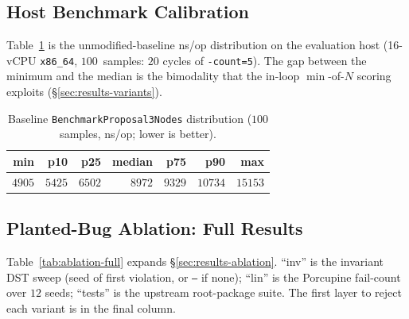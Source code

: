 \documentclass{article}
\begin{document}
\subsection{Host Benchmark Calibration}
\label{app:calibration}
Table~\ref{tab:calibration} is the unmodified-baseline ns/op
distribution on the evaluation host (16-vCPU \texttt{x86\_64},
$100$~samples: $20$ cycles of \texttt{-count=5}). The gap between the
minimum and the median is the bimodality that the in-loop
$\min$-of-$N$ scoring exploits (\S\ref{sec:results-variants}).

\begin{table}[h]
  \caption{Baseline \texttt{BenchmarkProposal3Nodes} distribution
    ($100$ samples, ns/op; lower is better).}
  \label{tab:calibration}
  \centering
  \begin{tabular}{rrrrrrr}
    \toprule
    min & p10 & p25 & median & p75 & p90 & max \\
    \midrule
    $4905$ & $5425$ & $6502$ & $8972$ & $9329$ & $10734$ & $15153$ \\
    \bottomrule
  \end{tabular}
\end{table}

\subsection{Planted-Bug Ablation: Full Results}
\label{app:ablation}
Table~\ref{tab:ablation-full} expands \S\ref{sec:results-ablation}.
``inv'' is the invariant DST sweep (seed of first violation, or
\texttt{--} if none); ``lin'' is the Porcupine fail-count over $12$
seeds; ``tests'' is the upstream root-package suite. The first layer
to reject each variant is in the final column.
\end{document}
